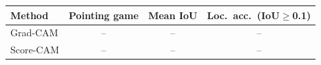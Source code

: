 \begin{tabular}{lccc}
\toprule
Method & Pointing game & Mean IoU & Loc.\ acc.\ (IoU$\ge$0.1) \\
\midrule
Grad-CAM  & -- & -- & -- \\
Score-CAM & -- & -- & -- \\
\bottomrule
\end{tabular}
